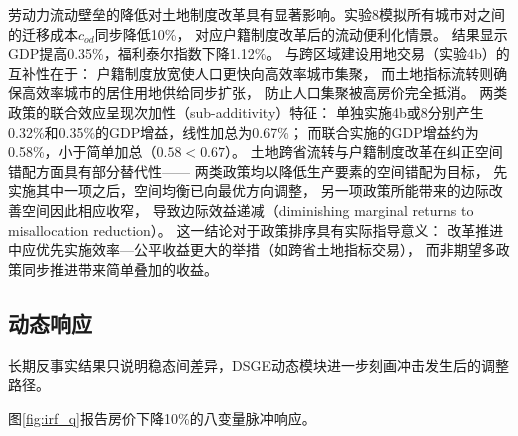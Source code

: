 \documentclass[UTF8,a4paper,12pt]{ctexart}
\theoremstyle{plain}
\theoremstyle{definition}
\theoremstyle{remark}
\begin{document}
劳动力流动壁垒的降低对土地制度改革具有显著影响。实验8模拟所有城市对之间的迁移成本$c_{od}$同步降低10\%，
对应户籍制度改革后的流动便利化情景。
结果显示GDP提高0.35\%，福利泰尔指数下降1.12\%。
与跨区域建设用地交易（实验4b）的互补性在于：
户籍制度放宽使人口更快向高效率城市集聚，
而土地指标流转则确保高效率城市的居住用地供给同步扩张，
防止人口集聚被高房价完全抵消。
两类政策的联合效应呈现次加性（sub-additivity）特征：
单独实施4b或8分别产生0.32\%和0.35\%的GDP增益，线性加总为0.67\%；
而联合实施的GDP增益约为0.58\%，小于简单加总（$0.58 < 0.67$）。
土地跨省流转与户籍制度改革在纠正空间错配方面具有部分替代性——
两类政策均以降低生产要素的空间错配为目标，
先实施其中一项之后，空间均衡已向最优方向调整，
另一项政策所能带来的边际改善空间因此相应收窄，
导致边际效益递减（diminishing marginal returns to misallocation reduction）。
这一结论对于政策排序具有实际指导意义：
改革推进中应优先实施效率—公平收益更大的举措（如跨省土地指标交易），
而非期望多政策同步推进带来简单叠加的收益。

\subsection{动态响应}

长期反事实结果只说明稳态间差异，DSGE动态模块进一步刻画冲击发生后的调整路径。

图\ref{fig:irf_q}报告房价下降10\%的八变量脉冲响应。
\end{document}
